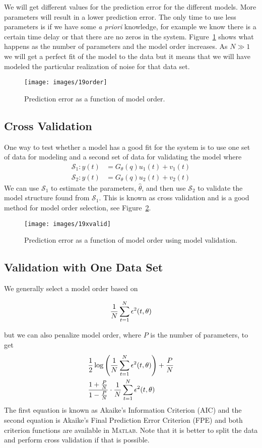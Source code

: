 We will get different values for the prediction error for the different models.
More parameters will result in a lower prediction error.
The only time to use less parameters is if we have some \textit{a priori} knowledge, for example we know there is a certain time delay or that there are no zeros in the system.
Figure~\ref{fig:19order} shows what happens as the number of parameters and the model order increases.
As $N\gg1$ we will get a perfect fit of the model to the data but it means that we will have modeled the particular realization of noise for that data set.

\begin{figure}[ht!]
\centering
\texttt{[image: images/19order]}
\caption{Prediction error as a function of model order.}%
\label{fig:19order}
\end{figure}

\subsection{Cross Validation}
One way to test whether a model has a good fit for the system is to use one set of data for modeling and a second set of data for validating the model where
\begin{align*}
\mathcal{S}_1: y(t) &= G_\theta(q)u_1(t) + v_1(t) \\
\mathcal{S}_2: y(t) &= G_\theta(q)u_2(t) + v_2(t)
\end{align*}
We can use $\mathcal{S}_1$ to estimate the parameters, $\hat{\theta}$, and then use $\mathcal{S}_2$ to validate the model structure found from $\mathcal{S}_1$.
This is known as cross validation and is a good method for model order selection, see Figure~\ref{fig:19xvalid}.

\begin{figure}[ht!]
\centering
\texttt{[image: images/19xvalid]}
\caption{Prediction error as a function of model order using model validation.}%
\label{fig:19xvalid}
\end{figure}

\subsection{Validation with One Data Set}
We generally select a model order based on

\begin{equation*}
\frac{1}{N}\sum_{t=1}^N\epsilon^2(t,\theta)
\end{equation*}

but we can also penalize model order, where $P$ is the number of parameters, to get
\begin{align*}
&\frac{1}{2}\log\left(\frac{1}{N}\sum_{t=1}^N\epsilon^2(t,\theta)\right) + \frac{P}{N} \\
&\frac{1+\frac{P}{N}}{1-\frac{P}{N}}\cdot\frac{1}{N}\sum_{t=1}^N\epsilon^2(t,\theta)
\end{align*}
The first equation is known as Akaike's Information Criterion (AIC) and the second equation is Akaike's Final Prediction Error Criterion (FPE) and both criterion functions are available in \textsc{Matlab}.
Note that it is better to split the data and perform cross validation if that is possible.

